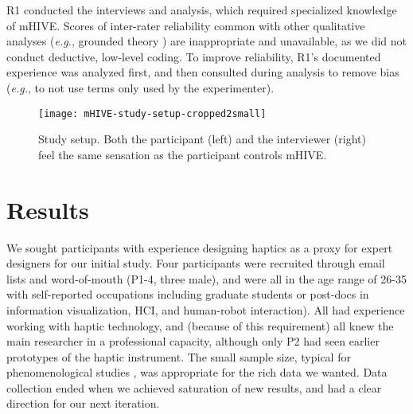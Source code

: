 \noindent
R1 conducted the interviews and analysis, which required specialized knowledge of mHIVE.
Scores of inter-rater reliability common with other qualitative analyses (\emph{e.g.}, grounded theory \cite{Corbin2008}) are inappropriate and unavailable, as we did not conduct deductive, low-level coding.
To improve reliability,  R1's documented experience was analyzed first, and then consulted during analysis to remove bias (\emph{e.g.}, to not use terms only used by the experimenter).


\begin{figure}[Htb]
	\centering
	   \texttt{[image: mHIVE-study-setup-cropped2small]} 
	   \caption{
	   Study setup. Both the participant (left) and the interviewer (right) feel the same sensation as the participant controls mHIVE.}
	   \label{fig:hapticinstrument:StudySetup}
\end{figure}


%
% 
\section{Results}

We sought participants with experience designing haptics as a proxy for expert designers for our initial study.
Four participants were recruited through email lists and word-of-mouth (P1-4, three male), and were all in the age range of 26-35 with self-reported occupations including graduate students or post-docs in information visualization, HCI, and human-robot interaction).
All had experience working with haptic technology, and (because of this requirement) all knew the main researcher in a professional capacity, although only P2 had seen earlier prototypes of the haptic instrument.
The small sample size, typical for phenomenological studies \cite{Creswell2013}, was appropriate for the rich data we wanted.
Data collection ended when we achieved saturation of new results, and had a clear direction for our next iteration.

